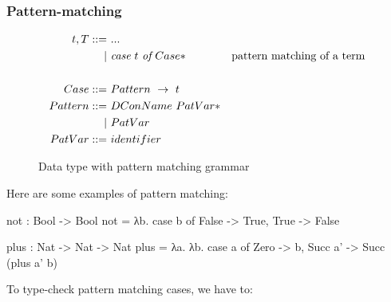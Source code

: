 \documentclass[12pt]{article}
\theoremstyle{definition}
\begin{document}
\subsubsection{Pattern-matching}

\begin{figure}[H]
       \[
              \begin{aligned}
                     t, T ::= & \ ... \\
                     |        & \ \emph{case}\ t\ \emph{of}\ Case* & \text{pattern matching of a term} \\
                     \\
                     Case      ::= & \ Pattern\ \rightarrow\ t \\
                     Pattern   ::= & \ DConName\ PatVar* \\
                     |             & \ PatVar   \\
                     PatVar    ::= & \ identifier
              \end{aligned}
       \]
       \caption{Data type with pattern matching grammar}
\end{figure}

Here are some examples of pattern matching:

\begin{piforall}
not : Bool -> Bool
not = λb. case b of {
  False -> True,
  True -> False
}

plus : Nat -> Nat -> Nat
plus = λa. λb. case a of {
  Zero -> b,
  Succ a' -> Succ (plus a' b)
}
\end{piforall}

To type-check pattern matching cases, we have to:
\end{document}
